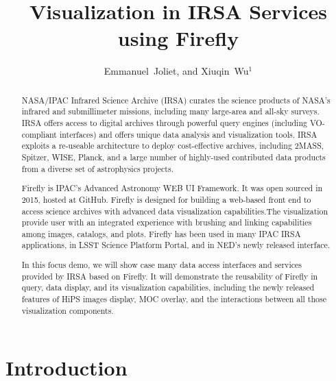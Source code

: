 \documentclass[11pt,twoside]{article}
\begin{document}
\title{Visualization in IRSA Services using Firefly}


\author{Emmanuel~Joliet, and Xiuqin~Wu$^1$}




\begin{abstract}

NASA/IPAC Infrared Science Archive (IRSA) curates the science products of NASA's infrared and submillimeter missions, including many large-area and all-sky surveys. IRSA offers access to digital archives through powerful query engines (including VO-compliant interfaces) and offers unique data analysis and visualization tools. IRSA exploits a re-useable architecture to deploy cost-effective archives, including 2MASS, Spitzer, WISE, Planck, and a large number of highly-used contributed data products from a diverse set of astrophysics projects.

Firefly is IPAC's Advanced Astronomy WEB UI Framework. It was  open sourced in 2015, hosted at GitHub. Firefly is designed for building a web-based front end to access science archives  with advanced data visualization capabilities.The visualization provide user with an integrated experience with brushing and linking capabilities among images, catalogs, and plots.  Firefly has been used in many IPAC IRSA applications, in LSST Science Platform Portal, and in NED’s newly released interface.

In this focus demo, we will show case many data access interfaces and services provided by IRSA based on Firefly. It will demonstrate the reusability of Firefly in query, data display, and its visualization capabilities, including the newly released features of HiPS images display, MOC overlay, and the interactions between all those visualization components.

\end{abstract}

\section{Introduction}
\end{document}
